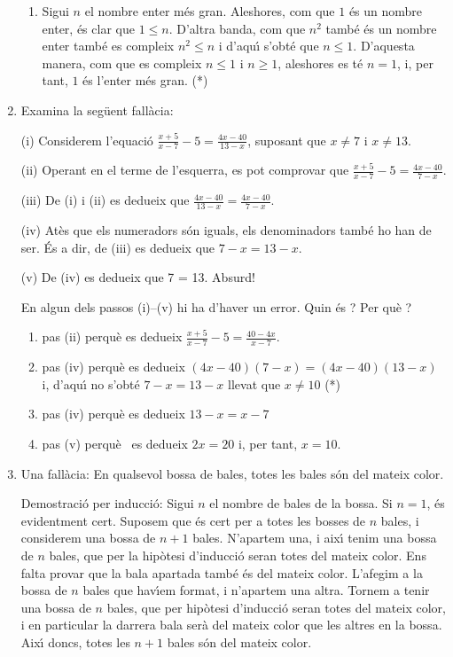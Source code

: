 \begin{enumerate}
\begin{enumerate}
\item Sigui $n$ el nombre enter m\'{e}s gran. Aleshores, com que $1$ \'{e}s un
nombre enter, \'{e}s clar que $1\leq n$. D'altra banda, com que $n^{2}$
tamb\'{e} \'{e}s un nombre enter tamb\'{e} es compleix $n^{2}\leq n$ i
d'aqu\'{\i} s'obt\'{e} que $n\leq1$. D'aquesta manera, com que es compleix
$n\leq1$ i $n\geq1$, aleshores es t\'{e} $n=1$, i, per tant, $1$ \'{e}s
l'enter m\'{e}s gran. (*)
\end{enumerate}

\item Examina la seg\"{u}ent fal\textperiodcentered l\`{a}cia:

(i) Considerem l'equaci\'{o} $\frac{x+5}{x-7}-5=\frac{4x-40}{13-x}$, suposant
que $x\neq7$ i $x\neq13$.

(ii) Operant en el terme de l'esquerra, es pot comprovar que $\frac{x+5}%
{x-7}-5=\frac{4x-40}{7-x}$.

(iii) De (i) i (ii) es dedueix que $\frac{4x-40}{13-x}=\frac{4x-40}{7-x}$.

(iv) At\`{e}s que els numeradors s\'{o}n iguals, els denominadors tamb\'{e} ho
han de ser. \'{E}s a dir, de (iii) es dedueix que $7-x=13-x$.

(v) De (iv) es dedueix que 7 = 13. Absurd!

En algun dels passos (i)--(v) hi ha d'haver un error. Quin \'{e}s ? Per
qu\`{e} ?

\begin{enumerate}
\item pas (ii) perqu\`{e} es dedueix $\frac{x+5}{x-7}-5=\frac{40-4x}{x-7}.$

\item pas (iv) perqu\`{e} es dedueix $\left(  4x-40\right)  \left(
7-x\right)  =\left(  4x-40\right)  \left(  13-x\right)  $ i, d'aqu\'{\i} no
s'obt\'{e} $7-x=13-x$ llevat que $x\neq10$ (*)

\item pas (iv) perqu\`{e} es dedueix $13-x=x-7$

\item pas (v) perqu\`{e} \ es dedueix $2x=20$ i, per tant, $x=10$.
\end{enumerate}

\item Una fal\textperiodcentered l\`{a}cia: En qualsevol bossa de bales, totes
les bales s\'{o}n del mateix color.

Demostraci\'{o} per inducci\'{o}: Sigui $n$ el nombre de bales de la bossa. Si
$n=1$, \'{e}s evidentment cert. Suposem que \'{e}s cert per a totes les bosses
de $n$ bales, i considerem una bossa de $n+1$ bales. N'apartem una, i
aix\'{\i} tenim una bossa de $n$ bales, que per la hip\`{o}tesi d'inducci\'{o}
seran totes del mateix color. Ens falta provar que la bala apartada tamb\'{e}
\'{e}s del mateix color. L'afegim a la bossa de $n$ bales que hav\'{\i}em
format, i n'apartem una altra. Tornem a tenir una bossa de $n$ bales, que per
hip\`{o}tesi d'inducci\'{o} seran totes del mateix color, i en particular la
darrera bala ser\`{a} del mateix color que les altres en la bossa. Aix\'{\i}
doncs, totes les $n+1$ bales s\'{o}n del mateix color.


\end{enumerate}

